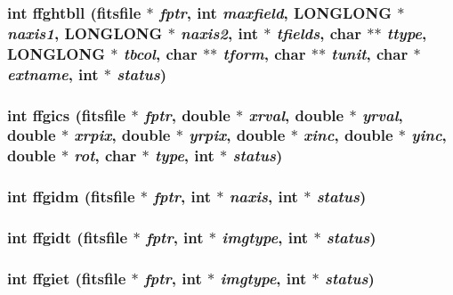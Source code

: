 \subsubsection{\setlength{\rightskip}{0pt plus 5cm}int ffghtbll (\bf{fitsfile} $\ast$ {\em fptr}, int {\em maxfield}, \bf{LONGLONG} $\ast$ {\em naxis1}, \bf{LONGLONG} $\ast$ {\em naxis2}, int $\ast$ {\em tfields}, char $\ast$$\ast$ {\em ttype}, \bf{LONGLONG} $\ast$ {\em tbcol}, char $\ast$$\ast$ {\em tform}, char $\ast$$\ast$ {\em tunit}, char $\ast$ {\em extname}, int $\ast$ {\em status})}\label{fitsio_8h_62e73d788b8463ca174a441efd62c055}


\subsubsection{\setlength{\rightskip}{0pt plus 5cm}int ffgics (\bf{fitsfile} $\ast$ {\em fptr}, double $\ast$ {\em xrval}, double $\ast$ {\em yrval}, double $\ast$ {\em xrpix}, double $\ast$ {\em yrpix}, double $\ast$ {\em xinc}, double $\ast$ {\em yinc}, double $\ast$ {\em rot}, char $\ast$ {\em type}, int $\ast$ {\em status})}\label{fitsio_8h_e41ae6ec4d4f1df61ce26ecc9d558fcb}


\subsubsection{\setlength{\rightskip}{0pt plus 5cm}int ffgidm (\bf{fitsfile} $\ast$ {\em fptr}, int $\ast$ {\em naxis}, int $\ast$ {\em status})}\label{fitsio_8h_2faefcdb1176d17c8159464da5f4fe3f}


\subsubsection{\setlength{\rightskip}{0pt plus 5cm}int ffgidt (\bf{fitsfile} $\ast$ {\em fptr}, int $\ast$ {\em imgtype}, int $\ast$ {\em status})}\label{fitsio_8h_3a8c6b776e15fb6a1ced2ac459366825}


\subsubsection{\setlength{\rightskip}{0pt plus 5cm}int ffgiet (\bf{fitsfile} $\ast$ {\em fptr}, int $\ast$ {\em imgtype}, int $\ast$ {\em status})}\label{fitsio_8h_d26898d66d9521c703b32f967a7ec68c}


